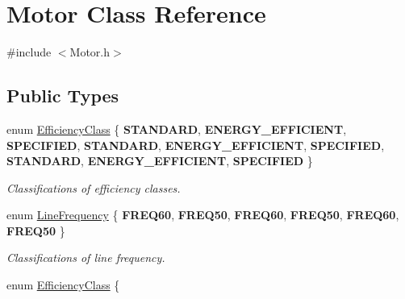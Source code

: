 \hypertarget{class_motor}{}\section{Motor Class Reference}
\label{class_motor}


{\ttfamily \#include $<$Motor.\+h$>$}

\subsection*{Public Types}
\begin{DoxyCompactItemize}
\item 
\mbox{\label{class_motor_afa022971ae062406a9f588c601673d4e}} 
enum \hyperlink{class_motor_afa022971ae062406a9f588c601673d4e}{Efficiency\+Class} \{ \newline
{\bfseries S\+T\+A\+N\+D\+A\+RD}, 
{\bfseries E\+N\+E\+R\+G\+Y\+\_\+\+E\+F\+F\+I\+C\+I\+E\+NT}, 
{\bfseries S\+P\+E\+C\+I\+F\+I\+ED}, 
{\bfseries S\+T\+A\+N\+D\+A\+RD}, 
\newline
{\bfseries E\+N\+E\+R\+G\+Y\+\_\+\+E\+F\+F\+I\+C\+I\+E\+NT}, 
{\bfseries S\+P\+E\+C\+I\+F\+I\+ED}, 
{\bfseries S\+T\+A\+N\+D\+A\+RD}, 
{\bfseries E\+N\+E\+R\+G\+Y\+\_\+\+E\+F\+F\+I\+C\+I\+E\+NT}, 
\newline
{\bfseries S\+P\+E\+C\+I\+F\+I\+ED}
 \}\begin{DoxyCompactList}\small\item\em Classifications of efficiency classes. \end{DoxyCompactList}
\item 
\mbox{\label{class_motor_acee1bdf1b684ad36cb80dc2829d9fcee}} 
enum \hyperlink{class_motor_acee1bdf1b684ad36cb80dc2829d9fcee}{Line\+Frequency} \{ \newline
{\bfseries F\+R\+E\+Q60}, 
{\bfseries F\+R\+E\+Q50}, 
{\bfseries F\+R\+E\+Q60}, 
{\bfseries F\+R\+E\+Q50}, 
\newline
{\bfseries F\+R\+E\+Q60}, 
{\bfseries F\+R\+E\+Q50}
 \}\begin{DoxyCompactList}\small\item\em Classifications of line frequency. \end{DoxyCompactList}
\item 
\mbox{\label{class_motor_afa022971ae062406a9f588c601673d4e}} 
enum \hyperlink{class_motor_afa022971ae062406a9f588c601673d4e}{Efficiency\+Class} \{ \newline

\end{DoxyCompactItemize}

